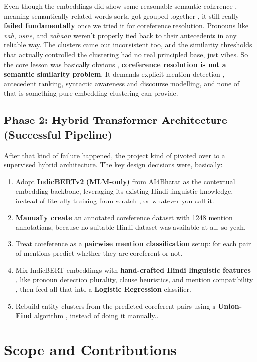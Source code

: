 \documentclass[12pt,a4paper]{report}
\begin{document}
Even though the embeddings did show some reasonable semantic coherence , meaning semantically related words sorta got grouped together , it still really \textbf{failed fundamentally} once we tried it for coreference resolution. Pronouns like \textit{vah}, \textit{usne}, and \textit{vahaan} weren’t properly tied back to their antecedents in any reliable way. The clusters came out inconsistent too, and the similarity thresholds that actually controlled the clustering had no real principled base, just vibes. So the core lesson was basically obvious , \textbf{coreference resolution is not a semantic similarity problem}. It demands explicit mention detection , antecedent ranking, syntactic awareness and discourse modelling, and none of that is something pure embedding clustering can provide.

\subsection{Phase 2: Hybrid Transformer Architecture (Successful Pipeline)}

After that kind of failure happened, the project kind of pivoted over to a supervised hybrid architecture. The key design decisions were, basically:

\begin{enumerate}
    \item Adopt \textbf{IndicBERTv2 (MLM-only)} from AI4Bharat as the contextual embedding backbone, leveraging its existing Hindi linguistic knowledge, instead of literally training from scratch , or whatever you call it.
    \item \textbf{Manually create } an annotated coreference dataset with 1248 mention annotations, because no suitable Hindi dataset was available at all, so yeah.
    \item Treat coreference as a \textbf{pairwise mention classification} setup: for each pair of mentions predict whether they are coreferent  or not.
    \item Mix IndicBERT embeddings with \textbf{hand-crafted Hindi linguistic features} , like pronoun detection plurality, clause heuristics, and mention compatibility , then feed all that into a \textbf{Logistic Regression} classifier.
    \item Rebuild entity clusters from the predicted coreferent pairs using a \textbf{Union-Find} algorithm , instead of doing it manually..
\end{enumerate}

\section{Scope and Contributions}
\end{document}
